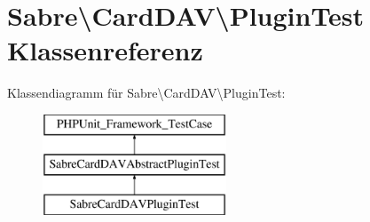 \hypertarget{class_sabre_1_1_card_d_a_v_1_1_plugin_test}{}\section{Sabre\textbackslash{}Card\+D\+AV\textbackslash{}Plugin\+Test Klassenreferenz}
\label{class_sabre_1_1_card_d_a_v_1_1_plugin_test}
Klassendiagramm für Sabre\textbackslash{}Card\+D\+AV\textbackslash{}Plugin\+Test\+:\begin{figure}[H]
\begin{center}
\leavevmode
\includegraphics[height=3.000000cm]{class_sabre_1_1_card_d_a_v_1_1_plugin_test}
\end{center}
\end{figure}
